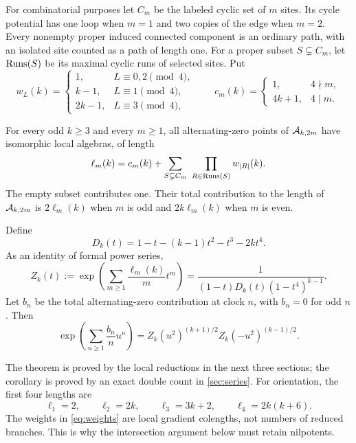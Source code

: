 For combinatorial purposes let $C_m$ be the labeled cyclic set of $m$
sites. Its cycle potential has one loop when $m=1$ and two copies of the
edge when $m=2$. Every nonempty proper induced connected component is an
ordinary path, with an isolated site counted as a path of length one.
For a proper subset $S\subsetneq C_m$, let $\operatorname{Runs}(S)$ be its maximal
cyclic runs of selected sites. Put
\begin{equation}\label{eq:weights}
 w_L(k)=
 \begin{cases}
  1,&L\equiv0,2\pmod4,\\
  k-1,&L\equiv1\pmod4,\\
  2k-1,&L\equiv3\pmod4,
 \end{cases}
 \qquad
 c_m(k)=
 \begin{cases}
  1,&4\nmid m,\\
  4k+1,&4\mid m.
 \end{cases}
\end{equation}

\begin{theorem}\label{thm:length}
For every odd $k\geq3$ and every $m\geq1$, all alternating-zero
points of $\mathcal A_{k,2m}$ have isomorphic local algebras, of length
\begin{equation}\label{eq:main_length}
 \ell_m(k)=c_m(k)+
  \sum_{S\subsetneq C_m}\ \prod_{R\in\operatorname{Runs}(S)}w_{|R|}(k).
\end{equation}
The empty subset contributes one. Their total contribution to the
length of $\mathcal A_{k,2m}$ is $2\ell_m(k)$ when $m$ is odd and
$2k\ell_m(k)$ when $m$ is even.
\end{theorem}

\begin{corollary}\label{cor:series}
Define
\begin{equation}\label{eq:D}
 D_k(t)=1-t-(k-1)t^2-t^3-2kt^4.
\end{equation}
As an identity of formal power series,
\begin{equation}\label{eq:Z}
 Z_k(t):=\exp\!\left(\sum_{m\geq1}\frac{\ell_m(k)}m t^m\right)
 =\frac1{(1-t)D_k(t)(1-t^4)^{k-1}}.
\end{equation}
Let $b_n$ be the total alternating-zero contribution at clock $n$, with
$b_n=0$ for odd $n$. Then
\begin{equation}\label{eq:native}
 \exp\!\left(\sum_{n\geq1}\frac{b_n}n u^n\right)
 =Z_k(u^2)^{(k+1)/2}Z_k(-u^2)^{(k-1)/2}.
\end{equation}
\end{corollary}

The theorem is proved by the local reductions in the next three sections;
the corollary is proved by an exact double count in \cref{sec:series}.
For orientation, the first four lengths are
\begin{equation}\label{eq:firstfour}
 \ell_1=2,\qquad \ell_2=2k,\qquad
 \ell_3=3k+2,\qquad \ell_4=2k(k+6).
\end{equation}
The weights in \eqref{eq:weights} are local gradient colengths, not numbers
of reduced branches. This is why the intersection argument below must
retain nilpotents.
